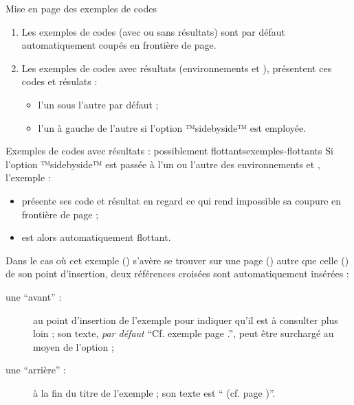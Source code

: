 \documentclass{letgut}
\begin{document}
\begin{dbremark}{Mise en page des exemples de codes}{}
  \begin{enumerate}
  \item Les exemples de codes (avec ou sans résultats) sont par défaut
    automatiquement coupés en frontière de page.
  \item Les exemples de codes avec résultats (environnements
     et ), présentent
    ces codes et résulats :
    \begin{itemize}
    \item l'un sous l'autre par défaut ;
    \item l'un à gauche de l'autre si l'option ™sidebyside™ est
      employée.
    \end{itemize}
  \end{enumerate}
\end{dbremark}

\begin{dbwarning}{Exemples de codes avec résultats : possiblement
    flottants}{exemples-flottants}
  Si l'option ™sidebyside™ est passée à l'un ou l'autre des
  environnements  et ,
  l'exemple :
  \begin{itemize}
  \item présente ses code et résultat en regard ce qui rend impossible sa
    coupure en frontière de page ;
  \item est alors automatiquement flottant.
  \end{itemize}
  Dans le cas où cet exemple (\no{}) s'avère se trouver sur une page
  () autre que celle () de son point d'insertion, deux
  références croisées sont automatiquement insérées :
  \begin{description}
  \item[une \enquote{avant} :] au point d'insertion de l'exemple pour indiquer
    qu'il est à consulter plus loin ; son texte, \emph{par défaut}
    \enquote{Cf. exemple  page .}, peut être surchargé au moyen
    de l'option  ;
  \item[une \enquote{arrière} :] à la fin du titre de l'exemple ; son texte est
    \enquote{ (cf. page )}.
  \end{description}
\end{dbwarning}
\end{document}
